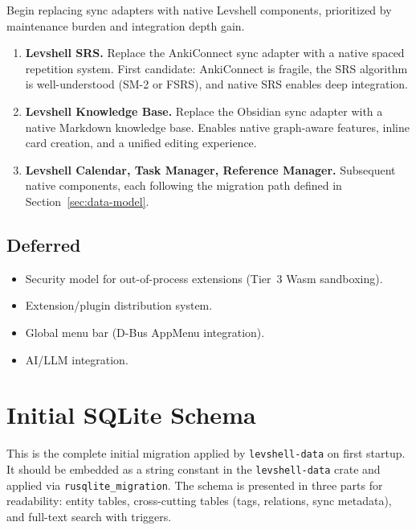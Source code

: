 \documentclass[11pt,a4paper]{article}
\begin{document}
Begin replacing sync adapters with native Levshell components, prioritized by maintenance burden and integration depth gain.

\begin{enumerate}[leftmargin=1.5em, itemsep=4pt]
  \item \textbf{Levshell SRS.} Replace the AnkiConnect sync adapter with a native spaced repetition system. First candidate: AnkiConnect is fragile, the SRS algorithm is well-understood (SM-2 or FSRS), and native SRS enables deep integration.

  \item \textbf{Levshell Knowledge Base.} Replace the Obsidian sync adapter with a native Markdown knowledge base. Enables native graph-aware features, inline card creation, and a unified editing experience.

  \item \textbf{Levshell Calendar, Task Manager, Reference Manager.} Subsequent native components, each following the migration path defined in Section~\ref{sec:data-model}.
\end{enumerate}

\subsection{Deferred}

\begin{itemize}[leftmargin=1.5em, itemsep=2pt]
  \item Security model for out-of-process extensions (Tier~3 Wasm sandboxing).
  \item Extension/plugin distribution system.
  \item Global menu bar (D-Bus AppMenu integration).
  \item AI/LLM integration.
\end{itemize}


\newpage
\appendix
\section{Initial SQLite Schema}
\label{app:schema}

This is the complete initial migration applied by \texttt{levshell-data} on first startup. It should be embedded as a string constant in the \texttt{levshell-data} crate and applied via \texttt{rusqlite\_migration}. The schema is presented in three parts for readability: entity tables, cross-cutting tables (tags, relations, sync metadata), and full-text search with triggers.
\end{document}
